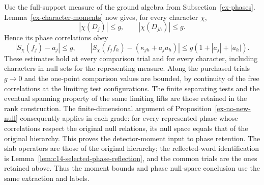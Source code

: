 Use the full-support measure of the ground algebra from
Subsection~\ref{ex-phases}. Lemma~\ref{ex-character-moments} now gives,
for every character $\chi$,
\[
              |\chi(D_j)|\leq g,\qquad |\chi(D_{jh})|\leq g.
\]
Hence its phase correlations obey
\[
 |S_\chi(f_j)-a_j|\leq g,\qquad
 |S_\chi(f_jf_h)-(\kappa_{jh}+a_ja_h)|
                  \leq g(1+|a_j|+|a_h|).
\]
These estimates hold at every comparison trial and for every character,
including characters in null sets for the representing measure. Along
the purchased trials $g\to0$ and the one-point comparison values are
bounded, by continuity of the free correlations at the limiting test
configurations. The finite separating tests and the eventual spanning
property of the same limiting lifts are those retained in the rank
construction. The finite-dimensional argument of
Proposition~\ref{ex-no-new-null} consequently applies in each grade:
for every represented phase whose correlations respect the original
null relations, its null space equals that of the original hierarchy.
This proves the detector-moment input to phase retention. The slab
operators are those of the original hierarchy; the reflected-word
identification is Lemma~\ref{lem:c14-selected-phase-reflection}, and
the common trials are the ones retained above. Thus the moment bounds
and phase null-space conclusion use the same extraction and labels.
